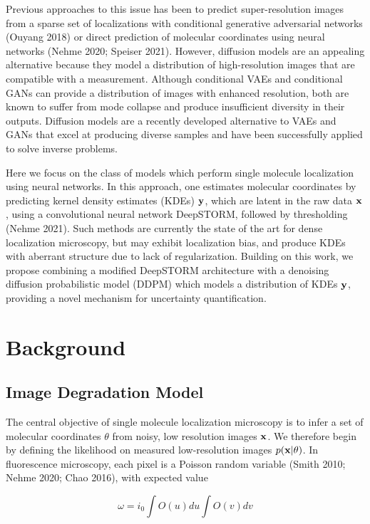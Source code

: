 \documentclass{article}
\begin{document}
Previous approaches to this issue has been to predict super-resolution images from a sparse set of localizations with conditional generative adversarial networks (Ouyang 2018) or direct prediction of molecular coordinates using neural networks (Nehme 2020; Speiser 2021). However, diffusion models are an appealing alternative because they model a distribution of high-resolution images that are compatible with a measurement. Although conditional VAEs and conditional GANs can provide a distribution of images with enhanced resolution, both are known to suffer from mode collapse and produce insufficient diversity in their outputs. Diffusion models are a recently developed alternative to VAEs and GANs that excel at producing diverse samples and have been successfully applied to solve inverse problems. 

Here we focus on the class of models which perform single molecule localization using neural networks. In this approach, one estimates molecular coordinates by predicting kernel density estimates (KDEs) $\bold{y}$, which are latent in the raw data $\bold{x}$, using a convolutional neural network DeepSTORM, followed by thresholding (Nehme 2021). Such methods are currently the state of the art for dense localization microscopy, but may exhibit localization bias, and produce KDEs with aberrant structure due to lack of regularization. Building on this work, we propose combining a modified DeepSTORM architecture with a denoising diffusion probabilistic model (DDPM) which models a distribution of KDEs $\bold{y}$, providing a novel mechanism for uncertainty quantification. 

\section{Background}

\subsection{Image Degradation Model}

The central objective of single molecule localization microscopy is to infer a set of molecular coordinates $\theta$ from noisy, low resolution images $\bold{x}$. We therefore begin by defining the likelihood on measured low-resolution images $p(\bold{x}|\theta)$. In fluorescence microscopy, each pixel is a Poisson random variable (Smith 2010; Nehme 2020; Chao 2016), with expected value

\begin{equation}
\omega = i_{0}\int O(u)du\int O(v)dv
\end{equation}
\end{document}
